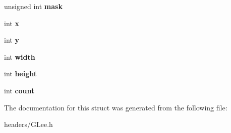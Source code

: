 \begin{DoxyCompactItemize}
\item 
\hypertarget{struct_g_l_x_buffer_clobber_event_s_g_i_x_a74b4ad1ad3cac011001151411f621da1}{unsigned int {\bfseries mask}}\label{struct_g_l_x_buffer_clobber_event_s_g_i_x_a74b4ad1ad3cac011001151411f621da1}

\item 
\hypertarget{struct_g_l_x_buffer_clobber_event_s_g_i_x_a5118d48c3c8d5253d39922b5014b52ff}{int {\bfseries x}}\label{struct_g_l_x_buffer_clobber_event_s_g_i_x_a5118d48c3c8d5253d39922b5014b52ff}

\item 
\hypertarget{struct_g_l_x_buffer_clobber_event_s_g_i_x_aef21efa11558a5b67861f96471c56003}{int {\bfseries y}}\label{struct_g_l_x_buffer_clobber_event_s_g_i_x_aef21efa11558a5b67861f96471c56003}

\item 
\hypertarget{struct_g_l_x_buffer_clobber_event_s_g_i_x_adad23535733161528427584a42bfc6eb}{int {\bfseries width}}\label{struct_g_l_x_buffer_clobber_event_s_g_i_x_adad23535733161528427584a42bfc6eb}

\item 
\hypertarget{struct_g_l_x_buffer_clobber_event_s_g_i_x_a7838dbabb76c22aa8241310a3f2363ea}{int {\bfseries height}}\label{struct_g_l_x_buffer_clobber_event_s_g_i_x_a7838dbabb76c22aa8241310a3f2363ea}

\item 
\hypertarget{struct_g_l_x_buffer_clobber_event_s_g_i_x_ad8f4f0aae058e0a1ff542679823e37a9}{int {\bfseries count}}\label{struct_g_l_x_buffer_clobber_event_s_g_i_x_ad8f4f0aae058e0a1ff542679823e37a9}

\end{DoxyCompactItemize}


The documentation for this struct was generated from the following file\+:\begin{DoxyCompactItemize}
\item 
headers/G\+Lee.\+h\end{DoxyCompactItemize}
